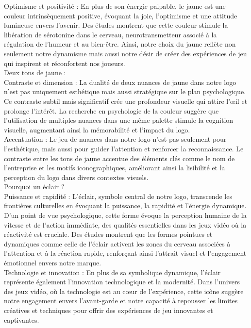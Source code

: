 Optimisme et positivité : En plus de son énergie palpable, le jaune est une couleur intrinsèquement positive, évoquant la joie, l'optimisme et une attitude lumineuse envers l'avenir. Des études montrent que cette couleur stimule la libération de sérotonine dans le cerveau, neurotransmetteur associé à la régulation de l'humeur et au bien-être. Ainsi, notre choix du jaune reflète non seulement notre dynamisme mais aussi notre désir de créer des expériences de jeu qui inspirent et réconfortent nos joueurs.
\\

Deux tons de jaune :
\\

Contraste et dimension : La dualité de deux nuances de jaune dans notre logo n'est pas uniquement esthétique mais aussi stratégique sur le plan psychologique. Ce contraste subtil mais significatif crée une profondeur visuelle qui attire l'œil et prolonge l'intérêt. La recherche en psychologie de la couleur suggère que l'utilisation de multiples nuances dans une même palette stimule la cognition visuelle, augmentant ainsi la mémorabilité et l'impact du logo.
\\

Accentuation : Le jeu de nuances dans notre logo n'est pas seulement pour l'esthétique, mais aussi pour guider l'attention et renforcer la reconnaissance. Le contraste entre les tons de jaune accentue des éléments clés comme le nom de l'entreprise et les motifs iconographiques, améliorant ainsi la lisibilité et la perception du logo dans divers contextes visuels.
\\

Pourquoi un éclair ?
\\

Puissance et rapidité : L'éclair, symbole central de notre logo, transcende les frontières culturelles en évoquant la puissance, la rapidité et l'énergie dynamique. D'un point de vue psychologique, cette forme évoque la perception humaine de la vitesse et de l'action immédiate, des qualités essentielles dans les jeux vidéo où la réactivité est cruciale. Des études montrent que les formes pointues et dynamiques comme celle de l'éclair activent les zones du cerveau associées à l'attention et à la réaction rapide, renforçant ainsi l'attrait visuel et l'engagement émotionnel envers notre marque.
\\

Technologie et innovation : En plus de sa symbolique dynamique, l'éclair représente également l'innovation technologique et la modernité. Dans l'univers des jeux vidéo, où la technologie est au cœur de l'expérience, cette icône suggère notre engagement envers l'avant-garde et notre capacité à repousser les limites créatives et techniques pour offrir des expériences de jeu innovantes et captivantes.
\\

